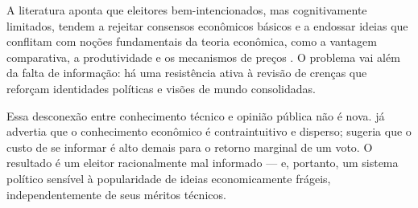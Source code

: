 A literatura aponta que eleitores bem-intencionados, mas cognitivamente limitados, tendem a rejeitar consensos econômicos básicos e a endossar ideias que conflitam com noções fundamentais da teoria econômica, como a vantagem comparativa, a produtividade e os mecanismos de preços \cite{Systematically_Biased_Beliefs_about_Economics,The_Myth_of_the_Rational_Voter}. O problema vai além da falta de informação: há uma resistência ativa à revisão de crenças que reforçam identidades políticas e visões de mundo consolidadas.

Essa desconexão entre conhecimento técnico e opinião pública não é nova.  já advertia que o conhecimento econômico é contraintuitivo e disperso;  sugeria que o custo de se informar é alto demais para o retorno marginal de um voto. O resultado é um eleitor racionalmente mal informado — e, portanto, um sistema político sensível à popularidade de ideias economicamente frágeis, independentemente de seus méritos técnicos.





